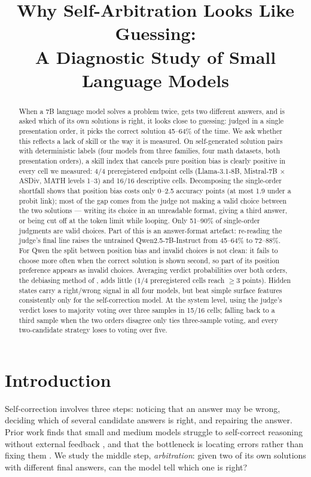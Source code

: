 \documentclass[11pt]{article}
\title{Why Self-Arbitration Looks Like Guessing:\\A Diagnostic Study of Small Language Models}
\author{\authorinfo{Author names, affiliations, email --- to be filled by the authors}}
\date{}
\begin{document}
\maketitle

\begin{abstract}
When a 7B language model solves a problem twice, gets two different answers, and is asked which of its own
solutions is right, it looks close to guessing: judged in a single presentation order, it picks the correct
solution 45--64\% of the time. We ask whether this reflects a lack of skill or the way it is measured. On
self-generated solution pairs with deterministic labels (four models from three families, four math datasets,
both presentation orders), a skill index that cancels pure position bias is clearly positive in every cell we
measured: 4/4 preregistered endpoint cells (Llama-3.1-8B, Mistral-7B $\times$ ASDiv, MATH levels 1--3) and
16/16 descriptive cells. Decomposing the single-order shortfall shows that position bias costs only 0--2.5
accuracy points (at most 1.9 under a probit link); most of the gap comes from the judge not making a valid
choice between the two solutions --- writing its choice in an unreadable format, giving a third answer, or
being cut off at the token limit while looping. Only 51--90\% of single-order judgments are valid choices. Part of this is an
answer-format artefact: re-reading the judge's final line raises the untrained Qwen2.5-7B-Instruct from
45--64\% to 72--88\%. For Qwen the split between position bias and invalid choices is not clean: it fails to
choose more often when the correct solution is shown second, so part of its position preference appears as
invalid choices. Averaging verdict probabilities over both orders, the debiasing method of
\citet{ren2023selfeval}, adds little (1/4 preregistered cells reach $\geq$3 points). Hidden states carry a
right/wrong signal in all four models, but beat simple surface features consistently only for the
self-correction model. At the system level, using the judge's verdict loses to majority voting over three
samples in 15/16 cells; falling back to a third sample when the two orders disagree only ties three-sample
voting, and every two-candidate strategy loses to voting over five.
\end{abstract}

\section{Introduction}
Self-correction involves three steps: noticing that an answer may be wrong, deciding which of several
candidate answers is right, and repairing the answer. Prior work finds that small and medium models struggle
to self-correct reasoning without external feedback \citep{huang2023cannot}, and that the bottleneck is
locating errors rather than fixing them \citep{tyen2024find}. We study the middle step, \emph{arbitration}:
given two of its own solutions with different final answers, can the model tell which one is right?
\end{document}
